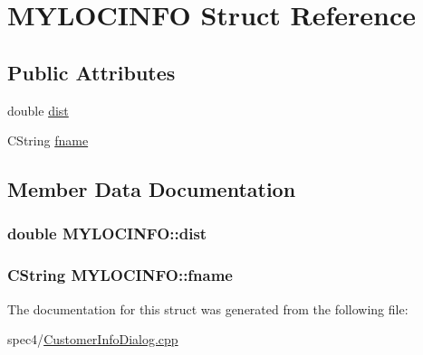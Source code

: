 \hypertarget{structMYLOCINFO}{
\section{MYLOCINFO Struct Reference}
\label{structMYLOCINFO}
}
\subsection*{Public Attributes}
\begin{DoxyCompactItemize}
\item 
double \hyperlink{structMYLOCINFO_a2b559418047a7e10564c0c8c1a81eb4e}{dist}
\item 
CString \hyperlink{structMYLOCINFO_a896a3cfa9082ed54451b9f69b81e5727}{fname}
\end{DoxyCompactItemize}


\subsection{Member Data Documentation}
\hypertarget{structMYLOCINFO_a2b559418047a7e10564c0c8c1a81eb4e}{
\subsubsection[{dist}]{\setlength{\rightskip}{0pt plus 5cm}double {\bf MYLOCINFO::dist}}}
\label{structMYLOCINFO_a2b559418047a7e10564c0c8c1a81eb4e}
\hypertarget{structMYLOCINFO_a896a3cfa9082ed54451b9f69b81e5727}{
\subsubsection[{fname}]{\setlength{\rightskip}{0pt plus 5cm}CString {\bf MYLOCINFO::fname}}}
\label{structMYLOCINFO_a896a3cfa9082ed54451b9f69b81e5727}


The documentation for this struct was generated from the following file:\begin{DoxyCompactItemize}
\item 
spec4/\hyperlink{CustomerInfoDialog_8cpp}{CustomerInfoDialog.cpp}\end{DoxyCompactItemize}
